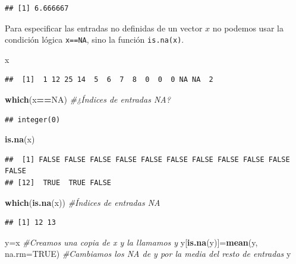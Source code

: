 \documentclass[]{book}
\newenvironment{Shaded}{\begin{snugshade}}{\end{snugshade}}
\newcommand{\CommentTok}[1]{\textcolor[rgb]{0.56,0.35,0.01}{\textit{#1}}}
\newcommand{\DataTypeTok}[1]{\textcolor[rgb]{0.13,0.29,0.53}{#1}}
\newcommand{\KeywordTok}[1]{\textcolor[rgb]{0.13,0.29,0.53}{\textbf{#1}}}
\newcommand{\NormalTok}[1]{#1}
\newcommand{\OperatorTok}[1]{\textcolor[rgb]{0.81,0.36,0.00}{\textbf{#1}}}
\newcommand{\OtherTok}[1]{\textcolor[rgb]{0.56,0.35,0.01}{#1}}
\theoremstyle{definition}
\theoremstyle{definition}
\theoremstyle{definition}
\theoremstyle{remark}
\begin{document}
\begin{verbatim}
## [1] 6.666667
\end{verbatim}

Para especificar las entradas no definidas de un vector \(x\) no podemos usar la condición lógica \texttt{x==NA}, sino la función \texttt{is.na(x)}.

\begin{Shaded}
\begin{Highlighting}[]
\NormalTok{x}
\end{Highlighting}
\end{Shaded}

\begin{verbatim}
##  [1]  1 12 25 14  5  6  7  8  0  0  0 NA NA  2
\end{verbatim}

\begin{Shaded}
\begin{Highlighting}[]
\KeywordTok{which}\NormalTok{(x}\OperatorTok{==}\OtherTok{NA}\NormalTok{) }\CommentTok{#¿Índices de entradas NA?}
\end{Highlighting}
\end{Shaded}

\begin{verbatim}
## integer(0)
\end{verbatim}

\begin{Shaded}
\begin{Highlighting}[]
\KeywordTok{is.na}\NormalTok{(x)}
\end{Highlighting}
\end{Shaded}

\begin{verbatim}
##  [1] FALSE FALSE FALSE FALSE FALSE FALSE FALSE FALSE FALSE FALSE FALSE
## [12]  TRUE  TRUE FALSE
\end{verbatim}

\begin{Shaded}
\begin{Highlighting}[]
\KeywordTok{which}\NormalTok{(}\KeywordTok{is.na}\NormalTok{(x))   }\CommentTok{#Índices de entradas NA}
\end{Highlighting}
\end{Shaded}

\begin{verbatim}
## [1] 12 13
\end{verbatim}

\begin{Shaded}
\begin{Highlighting}[]
\NormalTok{y=x  }\CommentTok{#Creamos una copia de x y la llamamos y}
\NormalTok{y[}\KeywordTok{is.na}\NormalTok{(y)]=}\KeywordTok{mean}\NormalTok{(y, }\DataTypeTok{na.rm=}\OtherTok{TRUE}\NormalTok{) }\CommentTok{#Cambiamos los NA de y por la media del resto de entradas}
\NormalTok{y}
\end{Highlighting}
\end{Shaded}
\end{document}
